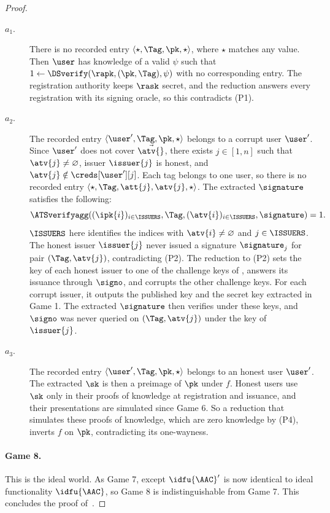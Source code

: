 \begin{proof}
  \begin{description}

    \item[$a_1$.] There is no recorded entry $\langle \star, \Tag, \pk, \star
\rangle$, where $\star$ matches any value. Then $\user$ has knowledge of a
valid $\psi$ such that $1 \leftarrow \DSverify(\rapk, (\pk, \Tag), \psi)$ with
no corresponding entry. The registration authority keeps $\rask$ secret, and
the reduction answers every registration with its signing oracle, so this
contradicts (P1).

    \item[$a_2$.] The recorded entry $\langle \user', \Tag, \pk, \star
\rangle$ belongs to a corrupt user $\user'$. Since $\user'$ does not cover
$\vec{\atv{}}$, there exists $j \in [1, n]$ such that $\atv{j} \neq
\varnothing$, issuer $\issuer{j}$ is honest, and $\atv{j} \notin
\creds[\user'][j]$. Each tag belongs to one user, so there is no recorded entry
$\langle \star, \Tag, \att{j}, \atv{j}, \star \rangle$. The extracted
$\signature$ satisfies the following:
      \begin{equation*}
	\ATSverifyagg((\ipk{i})_{i\in \ISSUERS},\Tag,(\atv{i})_{i\in\ISSUERS},
\signature) = 1.
      \end{equation*}
      $\ISSUERS$ here identifies the indices with $\atv{i} \neq \varnothing$ and
$j \in \ISSUERS$. The honest issuer $\issuer{j}$ never issued a signature
$\signature_j$ for pair $(\Tag, \atv{j})$, contradicting (P2). The reduction to
(P2) sets the key of each honest issuer to one of the challenge keys of
, answers its issuance through $\signo$, and corrupts the
other challenge keys. For each corrupt issuer, it outputs the published key and
the secret key extracted in Game 1. The extracted $\signature$ then verifies
under these keys, and $\signo$ was never queried on $(\Tag, \atv{j})$ under the
key of $\issuer{j}$.

    \item[$a_3$.] The recorded entry $\langle \user', \Tag, \pk, \star
\rangle$ belongs to an honest user $\user'$. The extracted $\sk$ is then a
preimage of $\pk$ under $f$. Honest users use $\sk$ only in their proofs of
knowledge at registration and issuance, and their presentations are simulated
since Game 6. So a reduction that simulates these proofs of knowledge, which
are zero knowledge by (P4), inverts $f$ on $\pk$, contradicting its one-wayness.

  \end{description}

  \paragraph{Game 8.} This is the ideal world. As Game 7, except $\idfu{\AAC}'$
is now identical to ideal functionality $\idfu{\AAC}$, so Game 8 is
indistinguishable from Game 7. This concludes the proof
of~.

\end{proof}


